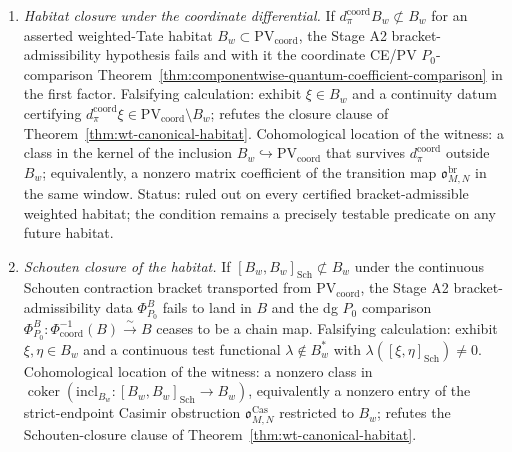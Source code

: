 \begin{enumerate}
\item[\((F1)\)] \emph{Habitat closure under the coordinate differential.}
  If
  \(d_\pi^{\mathrm{coord}}B_w\not\subset B_w\)
  for an asserted weighted-Tate habitat
  \(B_w\subset\mathrm{PV}_{\mathrm{coord}}\), the Stage A2
  bracket-admissibility hypothesis fails and with it the coordinate
  CE/PV \(P_0\)-comparison
  Theorem~\ref{thm:componentwise-quantum-coefficient-comparison}
  in the first factor.
  Falsifying calculation: exhibit
  \(\xi\in B_w\) and a continuity datum certifying
  \(d_\pi^{\mathrm{coord}}\xi\in
  \mathrm{PV}_{\mathrm{coord}}\setminus B_w\); refutes the closure
  clause of Theorem~\ref{thm:wt-canonical-habitat}.
  Cohomological location of the witness: a class in the kernel of the
  inclusion
  \(B_w\hookrightarrow\mathrm{PV}_{\mathrm{coord}}\) that survives
  \(d_\pi^{\mathrm{coord}}\) outside \(B_w\); equivalently, a nonzero
  matrix coefficient of the transition map
  \(\mathfrak o^{\mathrm{br}}_{M,N}\) in the same window.
  Status: ruled out on every certified bracket-admissible weighted
  habitat; the condition remains a precisely testable predicate on any
  future habitat.

\item[\((F2)\)] \emph{Schouten closure of the habitat.}
  If
  \([B_w,B_w]_{\mathrm{Sch}}\not\subset B_w\) under the continuous
  Schouten contraction bracket transported from
  \(\mathrm{PV}_{\mathrm{coord}}\), the Stage A2 bracket-admissibility
  data \(\Phi^B_{P_0}\) fails to land in \(B\) and the dg \(P_0\)
  comparison
  \(\Phi^B_{P_0}\colon\Phi_{\mathrm{coord}}^{-1}(B)\xrightarrow{\sim}B\)
  ceases to be a chain map.
  Falsifying calculation: exhibit \(\xi,\eta\in B_w\) and a continuous
  test functional \(\lambda\notin B_w^*\) with
  \(\lambda([\xi,\eta]_{\mathrm{Sch}})\ne0\).
  Cohomological location of the witness: a nonzero class in
  \(\operatorname{coker}(\mathrm{incl}_{B_w}\colon
  [B_w,B_w]_{\mathrm{Sch}}\to B_w)\), equivalently a nonzero entry of
  the strict-endpoint Casimir obstruction
  \(\mathfrak o^{\mathrm{Cas}}_{M,N}\) restricted to \(B_w\); refutes
  the Schouten-closure clause of
  Theorem~\ref{thm:wt-canonical-habitat}.


\end{enumerate}
